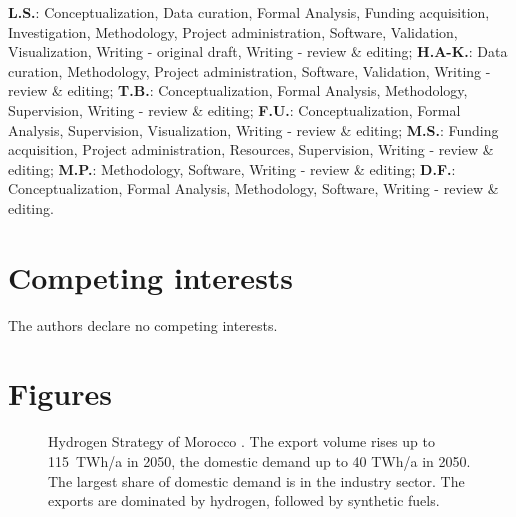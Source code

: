 \documentclass[5p,numafflabel]{elsarticle}
\begin{document}
\textbf{L.S.}:
Conceptualization,
Data curation,
Formal Analysis,
Funding acquisition,
Investigation,
Methodology,
Project administration,
Software,
Validation,
Visualization,
Writing - original draft,
Writing - review \& editing;
\textbf{H.A-K.}:
Data curation,
Methodology,
Project administration,
Software,
Validation,
Writing - review \& editing;
\textbf{T.B.}:
Conceptualization,
Formal Analysis,
Methodology,
Supervision,
Writing - review \& editing;
\textbf{F.U.}:
Conceptualization,
Formal Analysis,
Supervision,
Visualization,
Writing - review \& editing;
\textbf{M.S.}:
Funding acquisition,
Project administration,
Resources,
Supervision,
Writing - review \& editing;
\textbf{M.P.}:
Methodology,
Software,
Writing - review \& editing;
\textbf{D.F.}:
Conceptualization,
Formal Analysis,
Methodology,
Software,
Writing - review \& editing.


\section*{Competing interests}

The authors declare no competing interests.


\section*{Figures}


\begin{figure}[h!]
    \centering
    \caption{Hydrogen Strategy of Morocco \cite{MarHyStrat2021}. The export volume rises up to 115~TWh/a in 2050, the domestic demand up to 40 TWh/a in 2050. The largest share of domestic demand is in the industry sector. The exports are dominated by hydrogen, followed by synthetic fuels.}
    \label{fig:mar_hydrogen_strategy}
\end{figure}
\end{document}
